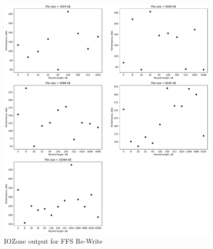 \begin{figure}[!htb]
	\label{fig:app_bench_ffs_rnd_read}
	\begin{center}
		\includegraphics[width=1.0\textwidth]{figures/benchmarking/ffs/Re-Writer.pdf}
	\end{center}
	\caption{IOZone output for FFS Re-Write}
\end{figure}



